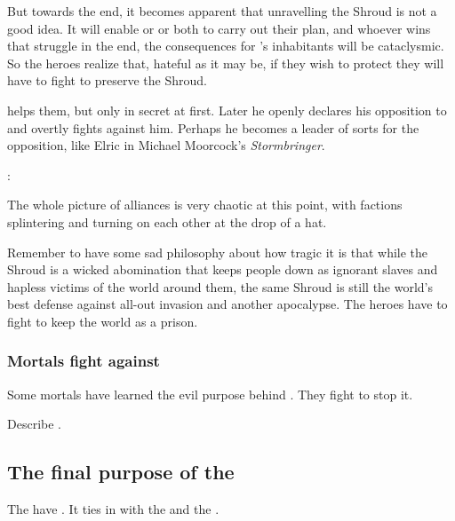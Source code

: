 But towards the end, it becomes apparent that unravelling the Shroud is not a good idea. It will enable \Daggerrain{} or \Secherdamon{} or both to carry out their plan, and whoever wins that struggle in the end, the consequences for \Miith{}'s inhabitants will be cataclysmic. So the heroes realize that, hateful as it may be, if they wish to protect \Miith{} they will have to fight to preserve the Shroud.

\Ishnaruchaefir{} helps them, but only in secret at first. Later he openly declares his opposition to \Secherdamon{} and overtly fights against him. Perhaps he becomes a leader of sorts for the opposition, like Elric in Michael Moorcock's \emph{Stormbringer}.

\Ishnaruchaefir: 

The whole picture of alliances is very chaotic at this point, with factions splintering and turning on each other at the drop of a hat.

Remember to have some sad philosophy about how tragic it is that while the Shroud is a wicked abomination that keeps people down as ignorant slaves and hapless victims of the world around them, the same Shroud is still the world's best defense against all-out invasion and another apocalypse. 
The heroes have to fight to keep the world as a prison. 





\subsubsection{Mortals fight against \iquin}
Some mortals have learned the evil purpose behind \iquin. 
They fight to stop it. 

Describe . 









\subsection{The final purpose of the \Sephiroth}
The  have . 
It ties in with the  and the . 







